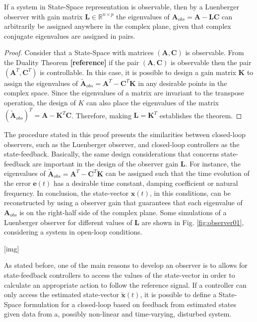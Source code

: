 \documentclass[a4paper,11pt]{book}
\numberwithin{figure}{chapter}
\numberwithin{equation}{chapter}
\numberwithin{table}{chapter}
\newtheorem{theorem}{Theorem}[chapter]
\theoremstyle{definition}
\newcounter{boxed-theorem}
\newenvironment{boxed-theorem}[1]
{\begin{shaded} \begin{theorem}{#1}}
{\end{theorem} \end{shaded}}
\newcounter{boxed-definition}
\begin{document}
\begin{boxed-theorem}
	If a system in State-Space representation is observable, then by a Luenberger observer with gain matrix $\bm{L} \in \mathbb{R}^{n \times p}$ the eigenvalues of $\bm{A}_{obs} = \bm{A} - \bm{L} \bm{C}$ can arbitrarily be assigned anywhere in the complex plane, given that complex conjugate eigenvalues are assigned in pairs.
\end{boxed-theorem} 

\begin{proof}
	Consider that a State-Space with matrices $(\bm{A}, \bm{C})$ is observable. From the Duality Theorem \textbf{[reference]} if the pair $(\bm{A}, \bm{C})$ is observable then the pair $(\bm{A}^T, \bm{C}^T)$ is controllable. In this case, it is possible to design 	a gain matrix $\bm{K}$ to assign the eigenvalues of $\tilde{\bm{A}}_{obs} = \bm{A}^T - \bm{C}^T \bm{K}$ in any desirable points in the complex space. Since the eigenvalues of a matrix are invariant to the transpose operation, the design of $K$ can also place the eigenvalues of the matrix $(\tilde{\bm{A}}_{obs})^T = \bm{A} - \bm{K}^T \bm{C}$. Therefore, making $\bm{L} = \bm{K}^T$ establishes the theorem.
\end{proof}

The procedure stated in this proof presents the similarities between closed-loop observers, such as the Luenberger observer, and closed-loop controllers as the state-feedback. Basically, the same design considerations that concerns state-feedback are important in the design of the observer gain $\bm{L}$. For instance, the eigenvalues of $\tilde{\bm{A}}_{obs} = \bm{A}^T - \bm{C}^T \bm{K}$ can be assigned such that the time evolution of the error $\bm{e}(t)$ has a desirable time constant, damping coefficient or natural frequency. In conclusion, the state-vector $\bm{x}(t)$, in this conditions, can be reconstructed by using a observer gain that guarantees that each eigenvalue of $\bm{A}_{obs}$ is on the right-half side of the complex plane. Some simulations of a Luenberger observer for different values of $\bm{L}$ are shown in Fig. \ref{fig:observer01}, considering a system in open-loop conditions.

[img]

As stated before, one of the main reasons to develop an observer is to allows for state-feedback controllers to access the values of the state-vector in order to calculate an appropriate action to follow the reference signal. If a controller can only access the estimated state-vector $\tilde{\bm{x}}(t)$, it is possible to define a State-Space formulation for a closed-loop based on feedback from estimated states given data from a, possibly non-linear and time-varying, disturbed system.
\end{document}
